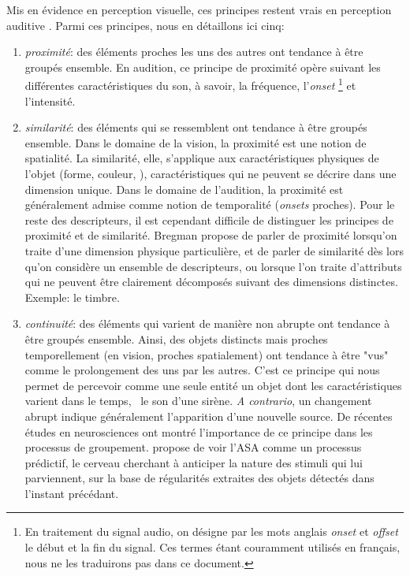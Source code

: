 Mis en évidence en perception visuelle, ces principes restent vrais en perception auditive \citep[ch. 1]{bregman1994auditory}. Parmi ces principes, nous en détaillons ici cinq:

\begin{enumerate}
\item \emph{proximité}: des éléments proches les uns des autres ont tendance à être groupés ensemble. En audition, ce principe de proximité opère suivant les différentes caractéristiques du son, à savoir, la fréquence, l'\emph{onset} \footnote{En traitement du signal audio, on désigne par les mots anglais \emph{onset} et \emph{offset} le début et la fin du signal. Ces termes étant couramment utilisés en français, nous ne les traduirons pas dans ce document.} et l'intensité.
 
\item \emph{similarité}: des éléments qui se ressemblent ont tendance à être groupés ensemble. 
Dans le domaine de la vision, la proximité est une notion de spatialité. La similarité, elle, s'applique aux caractéristiques physiques de l'objet (forme, couleur, \etc), caractéristiques qui ne peuvent se décrire dans une dimension unique. 
Dans le domaine de l'audition, la proximité est généralement admise comme notion de temporalité (\emph{onsets} proches). Pour le reste des descripteurs, il est cependant difficile de distinguer les principes de proximité et de similarité. Bregman propose de parler de proximité lorsqu'on traite d'une dimension physique particulière, et de parler de similarité dès lors qu'on considère un ensemble de descripteurs, ou lorsque l'on traite d'attributs qui ne peuvent être clairement décomposés suivant des dimensions distinctes. Exemple: le timbre.
\item \emph{continuité}: des éléments qui varient de manière non abrupte ont tendance à être groupés ensemble. Ainsi, des objets distincts mais proches temporellement (en vision, proches spatialement) ont tendance à être "vus" comme le prolongement des uns par les autres. C'est ce principe qui nous permet de percevoir comme une seule entité un objet dont les caractéristiques varient dans le temps, \eg~le son d'une sirène. \emph{A contrario}, un changement abrupt indique généralement l'apparition d'une nouvelle source. De récentes études en neurosciences ont montré l'importance de ce principe dans les processus de groupement. \citep{winkler2009modeling} propose de voir l'ASA comme un processus prédictif, le cerveau cherchant à anticiper la nature des stimuli qui lui parviennent, sur la base de régularités extraites des objets détectés dans l'instant précédant.

\end{enumerate}
